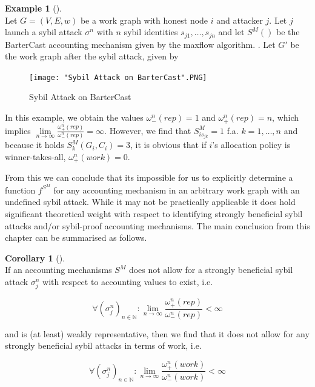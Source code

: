 \documentclass[11pt,a4paper]{article}
\theoremstyle{definition}
\theoremstyle{theorem}
\theoremstyle{proposition}
\theoremstyle{corollary}
\newtheorem{corollary}{Corollary}[section]
\theoremstyle{lemma}
\theoremstyle{example}
\newtheorem{example}{Example}[section]
\theoremstyle{remark}
\begin{document}
\begin{example}[]\ \\
Let $G=(V,E,w)$ be a work graph with honest node $i$ and attacker $j$. Let $j$ launch a sybil attack $\sigma^n$ with $n$ sybil identities $s_{j1},\ldots,s_{jn}$ and let $S^M()$ be the BarterCast accounting mechanism given by the maxflow algorithm. \cite{Bartercast: A Practical Approach to Prevent Lazy Freeriding in P2P Networks}. Let $G'$ be the work graph after the sybil attack, given by 

\begin{figure}[H]
\begin{center}
\texttt{[image: "Sybil Attack on BarterCast".PNG]}
\caption{Sybil Attack on BarterCast}
\label{fig:Sybil Attack on BarterCast}
\end{center}
\end{figure} 

\noindent{}In this example, we obtain the values $\omega_{-}^{n}(rep)=1$ and $\omega_{+}^{n}(rep)=n$, which implies $\lim\limits_{n\rightarrow\infty}\frac{\omega_{+}^{n}(rep)}{\omega_{-}^{n}(rep)}=\infty$. However, we find that $S^M_{is_{jk}}=1$ f.a. $k=1,\ldots,n$ and because it holds $S^M_k(G_i,C_i)=3$, it is obvious that if $i$'s allocation policy is winner-takes-all, $\omega^{n}_{+}(work)=0$.
\end{example}

\noindent{}From this we can conclude that its impossible for us to explicitly determine a function $f^{S^M}$ for any accounting mechanism in an arbitrary work graph with an undefined sybil attack. While it may not be practically applicable it does hold significant theoretical weight with respect to identifying strongly beneficial sybil attacks and/or sybil-proof accounting mechanisms. The main conclusion from this chapter can be summarised as follows. \vspace{1em}\\ 

\begin{corollary}[]\ \\
\noindent{}If an accounting mechanisms $S^M$ does not allow for a strongly beneficial sybil attack $\sigma_j^n$ with respect to accounting values to exist, i.e.

\[
\forall\left(\sigma_j^n\right)_{n\in\mathbb{N}}:\lim\limits_{n\rightarrow\infty}\frac{\omega^{n}_{+}(rep)}{\omega^{n}_{-}(rep)}<\infty
\]

\noindent{}and is (at least) weakly representative, then we find that it does not allow for any strongly beneficial sybil attacks in terms of work, i.e.

\[
\forall\left(\sigma_j^n\right)_{n\in\mathbb{N}}:\lim\limits_{n\rightarrow\infty}\frac{\omega^{n}_{+}(work)}{\omega^{n}_{-}(work)}<\infty
\]
\end{corollary}
 
\end{document}
